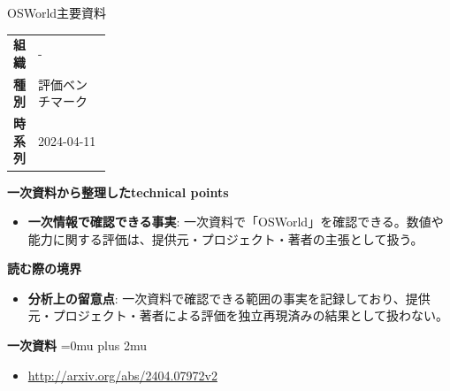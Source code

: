 \begin{technicalnote}{OSWorld}{主要資料}
\begingroup
\begin{tabularx}{\linewidth}{@{}>{\bfseries}p{0.22\linewidth}X@{}}
組織 & - \\
種別 & 評価ベンチマーク \\
時系列 & 2024-04-11 \\
\end{tabularx}
\smallskip
{\bfseries 一次資料から整理したtechnical points}
\begin{itemize}[leftmargin=1.5em,itemsep=0.35em]
\item \textbf{一次情報で確認できる事実}: 一次資料で「OSWorld」を確認できる。数値や能力に関する評価は、提供元・プロジェクト・著者の主張として扱う。
\end{itemize}
\begin{minipage}{\linewidth}
{\bfseries 読む際の境界}
\begin{itemize}[leftmargin=1.5em,itemsep=0.35em]
\item \textbf{分析上の留意点}: 一次資料で確認できる範囲の事実を記録しており、提供元・プロジェクト・著者による評価を独立再現済みの結果として扱わない。
\end{itemize}
\begin{samepage}
{\bfseries 一次資料}
\begingroup\sloppy
\Urlmuskip=0mu plus 2mu\relax
\begin{itemize}[leftmargin=1.5em,itemsep=0.25em]
\item {\scriptsize\url{http://arxiv.org/abs/2404.07972v2}}
\end{itemize}
\endgroup
\end{samepage}
\end{minipage}
\endgroup
\end{technicalnote}
\medskip

